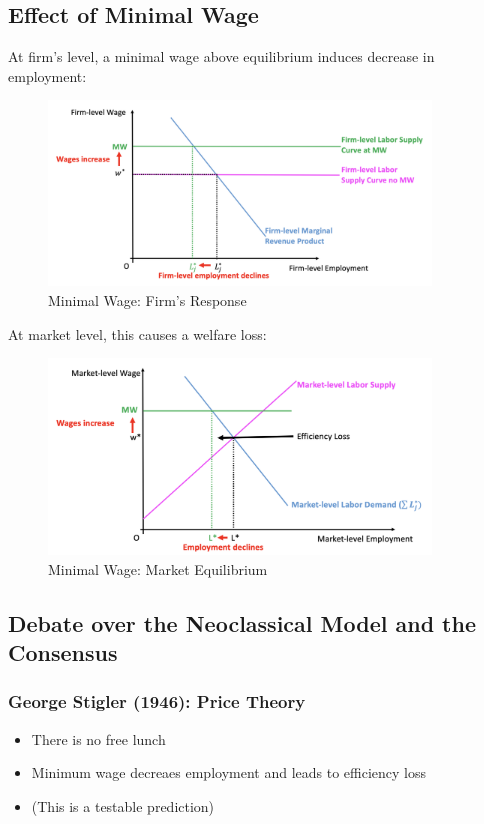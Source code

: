     \subsection{Effect of Minimal Wage}
        At firm's level, a minimal wage above equilibrium induces decrease in employment:
        \begin{figure}[H]
            \centering
            \includegraphics[width=4in]{images/ch2/neoclassical_3.png}
            \caption{Minimal Wage: Firm's Response}
        \end{figure}
        At market level, this causes a welfare loss:
        \begin{figure}[H]
            \centering
            \includegraphics[width=4in]{images/ch2/neoclassical_4.png}
            \caption{Minimal Wage: Market Equilibrium}
        \end{figure}
    
    \subsection{Debate over the Neoclassical Model and the Consensus}
    
        \subsubsection{George Stigler (1946): Price Theory}
            \begin{itemize}
                \item There is no free lunch
                \item Minimum wage decreaes employment and leads to efficiency loss
                \item (This is a testable prediction)
            \end{itemize}
            
